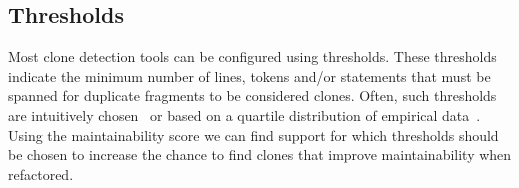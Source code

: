 \documentclass[conference]{IEEEtran}
\begin{document}
\subsection{Thresholds}
Most clone detection tools can be configured using thresholds. These thresholds indicate the minimum number of lines, tokens and/or statements that must be spanned for duplicate fragments to be considered clones. Often, such thresholds are intuitively chosen~\cite{li2006cp, roy2009mutation} or based on a quartile distribution of empirical data~\cite{alves2010deriving}. Using the maintainability score we can find support for which thresholds should be chosen to increase the chance to find clones that improve maintainability when refactored.


\end{document}
